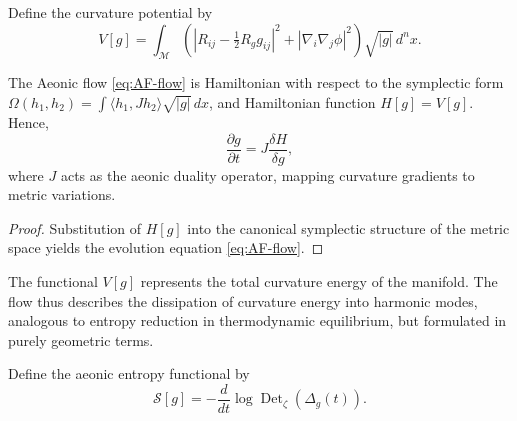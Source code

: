
\begin{definition}
\label{def:curvature-potential}
Define the curvature potential by
\begin{equation}
\label{eq:AF-curvature-potential}
V[g] = \int_{\mathcal{M}}
\left(
|R_{ij} - \tfrac{1}{2}R_g g_{ij}|^2
+ |\nabla_i\nabla_j \phi|^2
\right)
\sqrt{|g|}\,d^nx.
\end{equation}
\end{definition}

\begin{theorem}
\label{thm:AF-hamiltonian}
The Aeonic flow \eqref{eq:AF-flow}
is Hamiltonian with respect to the symplectic form
\(\Omega(h_1,h_2) = \int \langle h_1, J h_2\rangle \sqrt{|g|}\,dx\),
and Hamiltonian function \(H[g] = V[g]\).
Hence,
\begin{equation}
\frac{\partial g}{\partial t} = J \frac{\delta H}{\delta g},
\end{equation}
where \(J\) acts as the aeonic duality operator,
mapping curvature gradients to metric variations.
\end{theorem}

\begin{proof}
Substitution of \(H[g]\)
into the canonical symplectic structure of the metric space
yields the evolution equation \eqref{eq:AF-flow}.
\end{proof}

\begin{remark}
The functional \(V[g]\) represents the total curvature energy
of the manifold.
The flow thus describes the dissipation of curvature energy
into harmonic modes,
analogous to entropy reduction in thermodynamic equilibrium,
but formulated in purely geometric terms.
\end{remark}


\begin{definition}
\label{def:aeonic-entropy}
Define the aeonic entropy functional by
\begin{equation}
\label{eq:aeonic-entropy}
\mathcal{S}[g]
=
-\frac{d}{dt}
\log \operatorname{Det}_\zeta(\Delta_g(t)).
\end{equation}
\end{definition}

